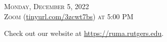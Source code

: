 \documentclass[12pt]{article}
\begin{document}
\begin{center}
\begin{spacing}{1.5}
    {\fontsize{24}{28}\selectfont  \textsc{
        Monday, December 5, 2022 \\ Zoom} (\lowercase{\url{tinyurl.com/3zcwt7bs}}) \textsc{at 5:00 PM}
    } 
\end{spacing}

\Large  Check out our website at 
\url{https://ruma.rutgers.edu}.
\end{center}
\end{document}
